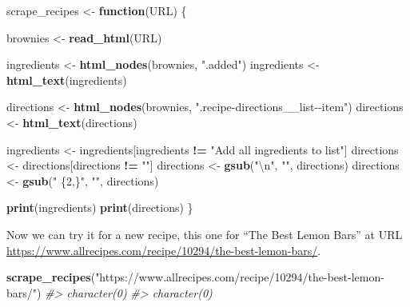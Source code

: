 \documentclass[
  12pt,
]{book}
\newenvironment{Shaded}{\begin{snugshade}}{\end{snugshade}}
\newcommand{\CharTok}[1]{\textcolor[rgb]{0.5,0.5,0.5}{#1}}
\newcommand{\CommentTok}[1]{\textcolor[rgb]{0.37,0.37,0.37}{\textit{#1}}}
\newcommand{\ControlFlowTok}[1]{\textcolor[rgb]{0.27,0.27,0.27}{\textbf{#1}}}
\newcommand{\KeywordTok}[1]{\textcolor[rgb]{0.27,0.27,0.27}{\textbf{#1}}}
\newcommand{\NormalTok}[1]{#1}
\newcommand{\OperatorTok}[1]{\textcolor[rgb]{0.43,0.43,0.43}{\textbf{#1}}}
\newcommand{\StringTok}[1]{\textcolor[rgb]{0.5,0.5,0.5}{#1}}
\begin{document}
\begin{Shaded}
\begin{Highlighting}[]
\NormalTok{scrape\_recipes \textless{}{-}}\StringTok{ }\ControlFlowTok{function}\NormalTok{(URL) \{}
  
\NormalTok{  brownies \textless{}{-}}\StringTok{ }\KeywordTok{read\_html}\NormalTok{(URL)}
  
\NormalTok{  ingredients \textless{}{-}}\StringTok{ }\KeywordTok{html\_nodes}\NormalTok{(brownies, }\StringTok{".added"}\NormalTok{)}
\NormalTok{  ingredients \textless{}{-}}\StringTok{ }\KeywordTok{html\_text}\NormalTok{(ingredients)}
  
\NormalTok{  directions \textless{}{-}}\StringTok{ }\KeywordTok{html\_nodes}\NormalTok{(brownies, }\StringTok{".recipe{-}directions\_\_list{-}{-}item"}\NormalTok{)}
\NormalTok{  directions \textless{}{-}}\StringTok{ }\KeywordTok{html\_text}\NormalTok{(directions)}
  
\NormalTok{  ingredients \textless{}{-}}\StringTok{ }\NormalTok{ingredients[ingredients }\OperatorTok{!=}\StringTok{ "Add all ingredients to list"}\NormalTok{]}
\NormalTok{  directions  \textless{}{-}}\StringTok{ }\NormalTok{directions[directions }\OperatorTok{!=}\StringTok{ ""}\NormalTok{]}
\NormalTok{  directions  \textless{}{-}}\StringTok{ }\KeywordTok{gsub}\NormalTok{(}\StringTok{"}\CharTok{\textbackslash{}n}\StringTok{"}\NormalTok{, }\StringTok{""}\NormalTok{, directions)}
\NormalTok{  directions  \textless{}{-}}\StringTok{ }\KeywordTok{gsub}\NormalTok{(}\StringTok{" \{2,\}"}\NormalTok{, }\StringTok{""}\NormalTok{, directions)}
  
  \KeywordTok{print}\NormalTok{(ingredients)}
  \KeywordTok{print}\NormalTok{(directions)}
\NormalTok{\}}
\end{Highlighting}
\end{Shaded}

Now we can try it for a new recipe, this one for ``The Best Lemon Bars'' at URL \url{https://www.allrecipes.com/recipe/10294/the-best-lemon-bars/}.

\begin{Shaded}
\begin{Highlighting}[]
\KeywordTok{scrape\_recipes}\NormalTok{(}\StringTok{"https://www.allrecipes.com/recipe/10294/the{-}best{-}lemon{-}bars/"}\NormalTok{)}
\CommentTok{\#\textgreater{} character(0)}
\CommentTok{\#\textgreater{} character(0)}
\end{Highlighting}
\end{Shaded}
\end{document}
